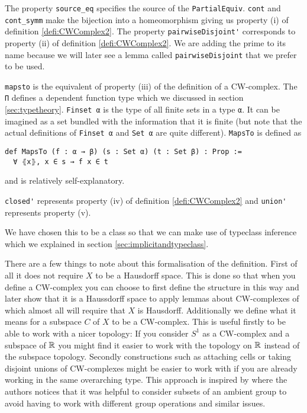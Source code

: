 The property \lstinline{source_eq} specifies the source of the \lstinline{PartialEquiv}. 
\lstinline{cont} and \lstinline{cont_symm} make the bijection into a homeomorphism giving us property (i) of definition \ref{defi:CWComplex2}.
The property \lstinline{pairwiseDisjoint'} corresponds to property (ii) of definition \ref{defi:CWComplex2}. 
We are adding the prime to its name because we will later see a lemma called \lstinline{pairwiseDisjoint} that we prefer to be used. 

\lstinline{mapsto} is the equivalent of property (iii) of the definition of a CW-complex. 
The \lstinline{Π} defines a dependent function type which we discussed in section \ref{sec:typetheory}.
\lstinline{Finset α} is the type of all finite sets in a type \lstinline{α}. 
It can be imagined as a set bundled with the information that it is finite (but note that the actual definitions of \lstinline{Finset α} and \lstinline{Set α} are quite different).
\lstinline{MapsTo} is defined as
\begin{lstlisting}
def MapsTo (f : α → β) (s : Set α) (t : Set β) : Prop := 
  ∀ ⦃x⦄, x ∈ s → f x ∈ t
\end{lstlisting}

and is relatively self-explanatory. 

\lstinline{closed'} represents property (iv) of definition \ref{defi:CWComplex2} and \lstinline{union'} represents property (v). 

\medskip

We have chosen this to be a class so that we can make use of typeclass inference which we explained in section \ref{sec:implicitandtypeclass}.

There are a few things to note about this formalisation of the definition. 
First of all it does not require $X$ to be a Hausdorff space. 
This is done so that when you define a CW-complex you can choose to first define the structure in this way and later show that it is a Haussdorff space to apply lemmas about CW-complexes of which almost all will require that $X$ is Hausdorff. 
Additionally we define what it means for a subspace $C$ of $X$ to be a CW-complex.
This is useful firstly to be able to work with a nicer topology: 
If you consider $S^1$ as a CW-complex and a subspace of $\mathbb{R}$ you might find it easier to work with the topology on $\mathbb{R}$ instead of the subspace topology. 
Secondly constructions such as attaching cells or taking disjoint unions of CW-complexes might be easier to work with if you are already working in the same overarching type.
This approach is inspired by \cite{Gonthier2013} where the authors notices that it was helpful to consider subsets of an ambient group to avoid having to work with different group operations and similar issues. 

